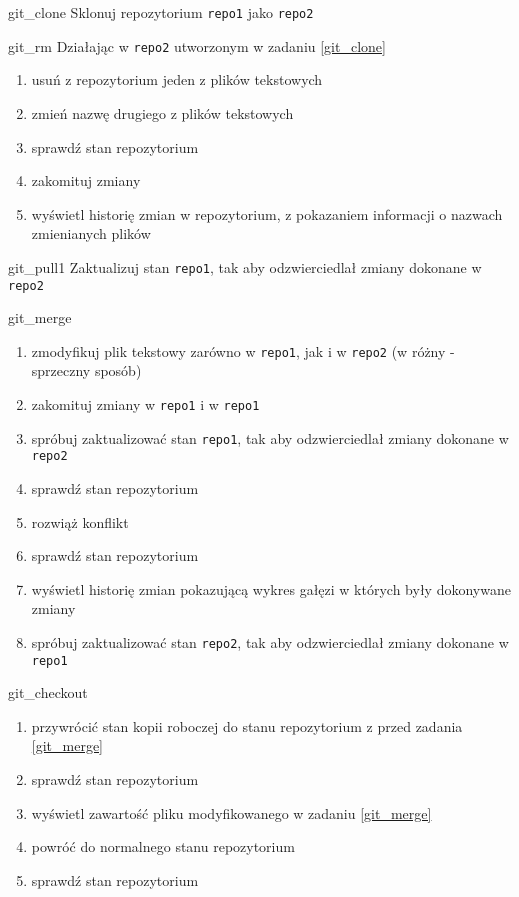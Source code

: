 \documentclass{pdfBooklets}
\begin{document}
\begin{Zadanie}{}{git_clone}
Sklonuj repozytorium \Verb#repo1# jako \Verb#repo2#
\end{Zadanie}

\begin{Zadanie}{}{git_rm}
Działając w \Verb#repo2# utworzonym w zadaniu \ref{git_clone}
\begin{enumerate}
\item usuń z repozytorium jeden z plików tekstowych
\item zmień nazwę drugiego z plików tekstowych
\item sprawdź stan repozytorium
\item zakomituj zmiany
\item wyświetl historię zmian w repozytorium, z pokazaniem informacji o nazwach zmienianych plików
\end{enumerate}
\end{Zadanie}

\begin{Zadanie}{}{git_pull1}
Zaktualizuj stan \Verb#repo1#, tak aby odzwierciedlał zmiany dokonane w \Verb#repo2#
\end{Zadanie}

\begin{Zadanie}{}{git_merge}
\begin{enumerate}
\item zmodyfikuj plik tekstowy zarówno w \Verb#repo1#, jak i w \Verb#repo2# (w różny - sprzeczny sposób)
\item zakomituj zmiany w \Verb#repo1# i w \Verb#repo1#
\item spróbuj zaktualizować stan \Verb#repo1#, tak aby odzwierciedlał zmiany dokonane w \Verb#repo2#
\item sprawdź stan repozytorium
\item rozwiąż konflikt
\item sprawdź stan repozytorium
\item wyświetl historię zmian pokazującą wykres gałęzi w których były dokonywane zmiany
\item spróbuj zaktualizować stan \Verb#repo2#, tak aby odzwierciedlał zmiany dokonane w \Verb#repo1#
\end{enumerate}
\end{Zadanie}

\begin{Zadanie}{}{git_checkout}
\begin{enumerate}
\item przywrócić stan kopii roboczej do stanu repozytorium z przed zadania \ref{git_merge}
\item sprawdź stan repozytorium
\item wyświetl zawartość pliku modyfikowanego w zadaniu \ref{git_merge}
\item powróć do normalnego stanu repozytorium
\item sprawdź stan repozytorium
\end{enumerate}
\end{Zadanie}
\end{document}
